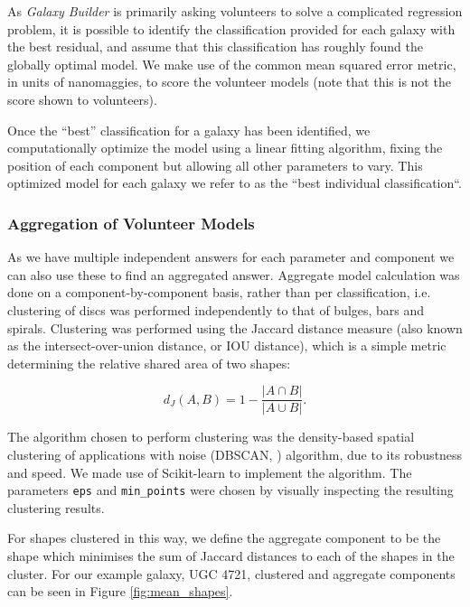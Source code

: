 \documentclass[../main.tex]{subfiles}
\begin{document}
As \textit{Galaxy Builder} is primarily asking volunteers to solve a complicated regression problem, it is possible to identify the classification provided for each galaxy with the best residual, and assume that this classification has roughly found the globally optimal model. We make use of the common mean squared error metric, in units of nanomaggies, to score the volunteer models (note that this is not the score shown to volunteers).

Once the ``best'' classification for a galaxy has been identified, we computationally optimize the model using a linear fitting algorithm, fixing the position of each component but allowing all other parameters to vary. This optimized model for each galaxy we refer to as the ``best individual classification``.

\subsubsection{Aggregation of Volunteer Models}
\label{sec:aggregation_of_volunteer_models}

As we have multiple independent answers for each parameter and component we can also use these to find an aggregated answer. Aggregate model calculation was done on a component-by-component basis, rather than per classification, i.e. clustering of discs was performed independently to that of bulges, bars and spirals. Clustering was performed using the Jaccard distance measure (also known as the intersect-over-union distance, or IOU distance), which is a simple metric determining the relative shared area of two shapes:

\begin{equation}
d_J(A, B) = 1 - \frac{|A \cap B|}{|A \cup B|}.
\end{equation}

The algorithm chosen to perform clustering was the density-based spatial clustering of applications with noise (DBSCAN, \citealt{dbscan}) algorithm, due to its robustness and speed. We made use of Scikit-learn \citep{scikit-learn} to implement the algorithm. The parameters \texttt{eps} and \texttt{min\_points} were chosen by visually inspecting the resulting clustering results.

For shapes clustered in this way, we define the aggregate component to be the shape which minimises the sum of Jaccard distances to each of the shapes in the cluster. For our example galaxy, UGC 4721, clustered and aggregate components can be seen in Figure \ref{fig:mean_shapes}.
\end{document}
